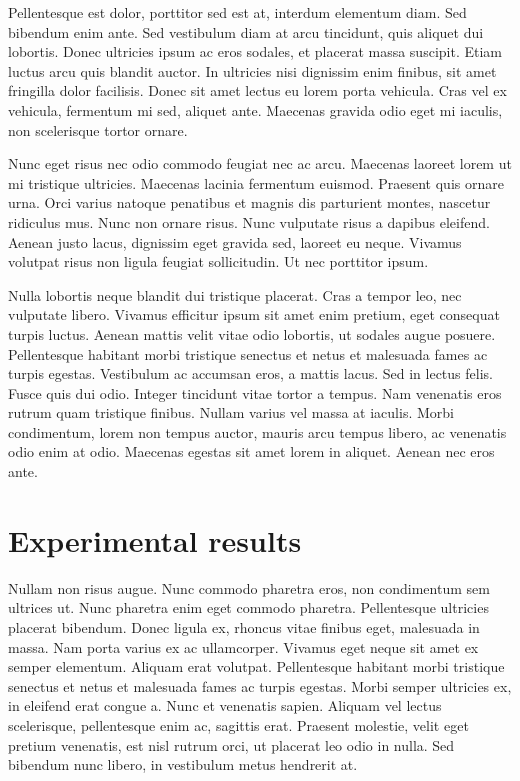 \documentclass{article}
\begin{document}
Pellentesque est dolor, porttitor sed est at, interdum elementum diam. Sed bibendum enim ante. Sed vestibulum diam at arcu tincidunt, quis aliquet dui lobortis. Donec ultricies ipsum ac eros sodales, et placerat massa suscipit. Etiam luctus arcu quis blandit auctor. In ultricies nisi dignissim enim finibus, sit amet fringilla dolor facilisis. Donec sit amet lectus eu lorem porta vehicula. Cras vel ex vehicula, fermentum mi sed, aliquet ante. Maecenas gravida odio eget mi iaculis, non scelerisque tortor ornare.

Nunc eget risus nec odio commodo feugiat nec ac arcu. Maecenas laoreet lorem ut mi tristique ultricies. Maecenas lacinia fermentum euismod. Praesent quis ornare urna. Orci varius natoque penatibus et magnis dis parturient montes, nascetur ridiculus mus. Nunc non ornare risus. Nunc vulputate risus a dapibus eleifend. Aenean justo lacus, dignissim eget gravida sed, laoreet eu neque. Vivamus volutpat risus non ligula feugiat sollicitudin. Ut nec porttitor ipsum.

Nulla lobortis neque blandit dui tristique placerat. Cras a tempor leo, nec vulputate libero. Vivamus efficitur ipsum sit amet enim pretium, eget consequat turpis luctus. Aenean mattis velit vitae odio lobortis, ut sodales augue posuere. Pellentesque habitant morbi tristique senectus et netus et malesuada fames ac turpis egestas. Vestibulum ac accumsan eros, a mattis lacus. Sed in lectus felis. Fusce quis dui odio. Integer tincidunt vitae tortor a tempus. Nam venenatis eros rutrum quam tristique finibus. Nullam varius vel massa at iaculis. Morbi condimentum, lorem non tempus auctor, mauris arcu tempus libero, ac venenatis odio enim at odio. Maecenas egestas sit amet lorem in aliquet. Aenean nec eros ante.
\section{Experimental results}
Nullam non risus augue. Nunc commodo pharetra eros, non condimentum sem ultrices ut. Nunc pharetra enim eget commodo pharetra. Pellentesque ultricies placerat bibendum. Donec ligula ex, rhoncus vitae finibus eget, malesuada in massa. Nam porta varius ex ac ullamcorper. Vivamus eget neque sit amet ex semper elementum. Aliquam erat volutpat. Pellentesque habitant morbi tristique senectus et netus et malesuada fames ac turpis egestas. Morbi semper ultricies ex, in eleifend erat congue a. Nunc et venenatis sapien. Aliquam vel lectus scelerisque, pellentesque enim ac, sagittis erat. Praesent molestie, velit eget pretium venenatis, est nisl rutrum orci, ut placerat leo odio in nulla. Sed bibendum nunc libero, in vestibulum metus hendrerit at.
\end{document}
